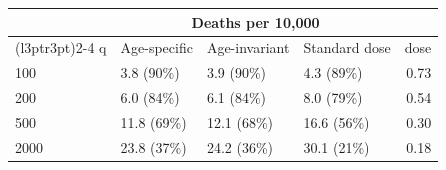
\begin{tabular}{llllr}
\toprule
\multicolumn{1}{c}{ } & \multicolumn{3}{c}{Deaths per 10,000} & \multicolumn{1}{c}{ } \\
\cmidrule(l{3pt}r{3pt}){2-4}
q & Age-specific & Age-invariant & Standard dose & dose\\
\midrule
100 & 3.8 (90\%) & 3.9 (90\%) & 4.3 (89\%) & 0.73\\
200 & 6.0 (84\%) & 6.1 (84\%) & 8.0 (79\%) & 0.54\\
500 & 11.8 (69\%) & 12.1 (68\%) & 16.6 (56\%) & 0.30\\
2000 & 23.8 (37\%) & 24.2 (36\%) & 30.1 (21\%) & 0.18\\
\bottomrule
\end{tabular}

